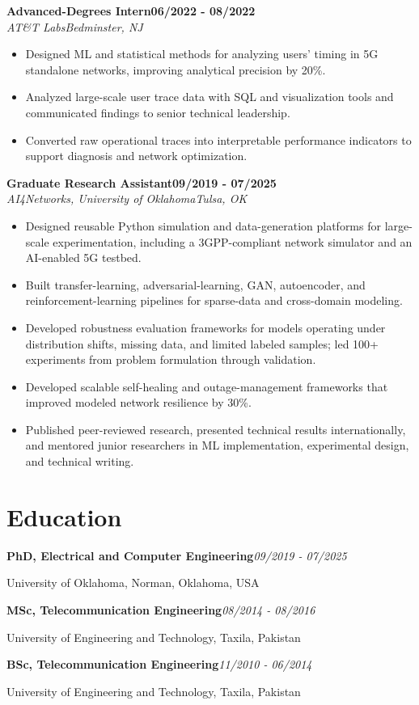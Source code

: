 \documentclass[9pt,letterpaper]{extarticle}
\newcommand{\role}[4]{%
  \Needspace{4\baselineskip}\textbf{#1}\hfill\textbf{#2}\\[-1pt]
  \textit{#3}\hfill\textit{#4}\par}
\newcommand{\entry}[2]{\Needspace{4\baselineskip}\textbf{#1}\hfill\textit{#2}\par}
\begin{document}
\role{Advanced-Degrees Intern}{06/2022 - 08/2022}{AT\&T Labs}{Bedminster, NJ}
\begin{itemize}
\item Designed ML and statistical methods for analyzing users' timing in 5G standalone networks, improving analytical precision by 20\%.
\item Analyzed large-scale user trace data with SQL and visualization tools and communicated findings to senior technical leadership.
\item Converted raw operational traces into interpretable performance indicators to support diagnosis and network optimization.
\end{itemize}
\role{Graduate Research Assistant}{09/2019 - 07/2025}{AI4Networks, University of Oklahoma}{Tulsa, OK}
\begin{itemize}
\item Designed reusable Python simulation and data-generation platforms for large-scale experimentation, including a 3GPP-compliant network simulator and an AI-enabled 5G testbed.
\item Built transfer-learning, adversarial-learning, GAN, autoencoder, and reinforcement-learning pipelines for sparse-data and cross-domain modeling.
\item Developed robustness evaluation frameworks for models operating under distribution shifts, missing data, and limited labeled samples; led 100+ experiments from problem formulation through validation.
\item Developed scalable self-healing and outage-management frameworks that improved modeled network resilience by 30\%.
\item Published peer-reviewed research, presented technical results internationally, and mentored junior researchers in ML implementation, experimental design, and technical writing.
\end{itemize}
\section{Education}
\entry{PhD, Electrical and Computer Engineering}{09/2019 - 07/2025}
University of Oklahoma, Norman, Oklahoma, USA\par
\entry{MSc, Telecommunication Engineering}{08/2014 - 08/2016}
University of Engineering and Technology, Taxila, Pakistan\par
\entry{BSc, Telecommunication Engineering}{11/2010 - 06/2014}
University of Engineering and Technology, Taxila, Pakistan\par
{}
\end{document}

